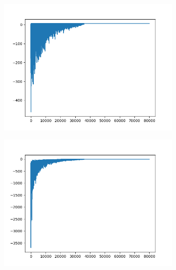 \begin{figure}[H]
	\centering
	\begin{subfigure}{.25\textwidth}
		\includegraphics[width=\textwidth]{img/train/matrice_0-11_17_55.png}
	\end{subfigure}%
	\begin{subfigure}{.25\textwidth}
		\includegraphics[width=\textwidth]{img/train/matrice_1-11_20_36.png}
	\end{subfigure}%
		\begin{subfigure}{.25\textwidth}

\end{subfigure}
\end{figure}
